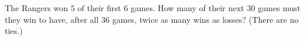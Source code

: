 The Rangers won $5$ of their first $6$ games. How many of their next $30$ games must they win to have, after all $36$ games, twice as many wins as losses? (There are no ties.)
